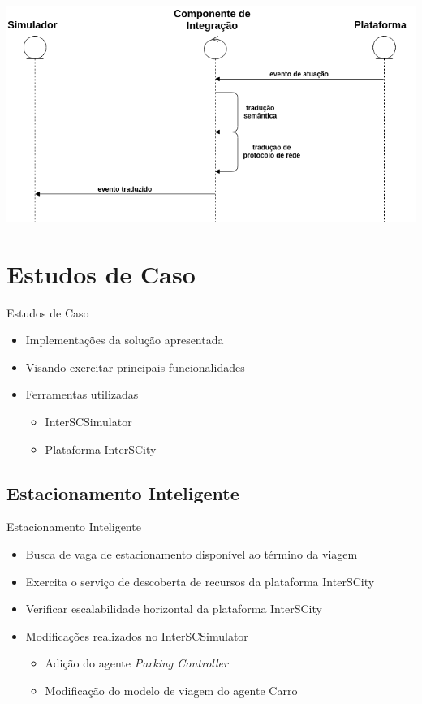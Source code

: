 \documentclass[xcolor={usenames,svgnames,dvipsnames},brazil,english,12pt,aspectratio=149]{beamer}
\begin{document}
\begin{frame}[plain]
    \begin{center}
        \includegraphics[width=.8\textwidth]{sequencia_eventos_atuacao.png}
    \end{center}
\end{frame}

\section{Estudos de Caso}

\begin{frame}{Estudos de Caso}
    \begin{itemize}
        \item Implementações da solução apresentada
        \item Visando exercitar principais funcionalidades
        \item Ferramentas utilizadas
            \begin{itemize}
                \item InterSCSimulator
                \item Plataforma InterSCity
            \end{itemize}
    \end{itemize}
\end{frame}

\subsection{Estacionamento Inteligente}

\begin{frame}{Estacionamento Inteligente}
    \begin{itemize}
        \item Busca de vaga de estacionamento disponível ao término da viagem 
        \item Exercita o serviço de descoberta de recursos da plataforma InterSCity
        \item Verificar escalabilidade horizontal da plataforma InterSCity
        \item Modificações realizados no InterSCSimulator
            \begin{itemize}
                \item Adição do agente \textit{Parking Controller}
                \item Modificação do modelo de viagem do agente Carro
            \end{itemize}
    \end{itemize}
\end{frame}
\end{document}
